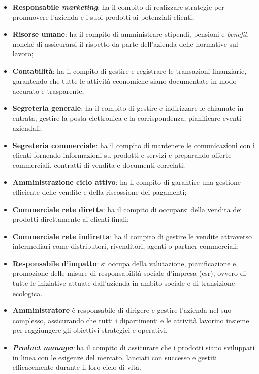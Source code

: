 \begin{itemize}
    \item \textbf{Responsabile \textit{marketing}}: ha il compito di realizzare strategie per promuovere l'azienda 
          e i suoi prodotti ai potenziali clienti;
    \item \textbf{Risorse umane}: ha il compito di amministrare stipendi, pensioni e \textit{benefit}, nonché di assicurarsi il rispetto da parte 
          dell'azienda delle normative sul lavoro;
    \item \textbf{Contabilità}: ha il compito di gestire e registrare le transazioni finanziarie, garantendo che tutte le attività economiche 
          siano documentate in modo accurato e trasparente;
    \item \textbf{Segreteria generale}: ha il compito di gestire e indirizzare le chiamate in entrata, gestire la posta elettronica e la 
          corrispondenza, pianificare eventi aziendali;
    \item \textbf{Segreteria commerciale}: ha il compito di mantenere le comunicazioni con i clienti fornendo informazioni su prodotti e 
          servizi e preparando offerte commerciali, contratti di vendita e documenti correlati;
    \item \textbf{Amministrazione ciclo attivo}: ha il compito di garantire una gestione efficiente delle vendite e della riscossione dei pagamenti;
    \item \textbf{Commerciale rete diretta}: ha il compito di occuparsi della vendita dei prodotti direttamente ai clienti finali;
    \item \textbf{Commerciale rete indiretta}: ha il compito di gestire le vendite attraverso intermediari come distributori, rivenditori, agenti o partner commerciali;
    \item \textbf{Responsabile d'impatto}: si occupa della valutazione, pianificazione e promozione delle misure di responsabilità sociale d'impresa 
          (\gls{csr}), ovvero di tutte le iniziative attuate dall'azienda in ambito sociale e di transizione ecologica.
    \item \textbf{Amministratore} è responsabile di dirigere e gestire l'azienda nel suo complesso, assicurando che tutti i dipartimenti e le attività 
          lavorino insieme per raggiungere gli obiettivi strategici e operativi.
    \item \textbf{\textit{Product manager}} ha il compito di assicurare che i prodotti siano sviluppati in linea con le esigenze del mercato, lanciati con
          successo e gestiti efficacemente durante il loro ciclo di vita.
\end{itemize}
